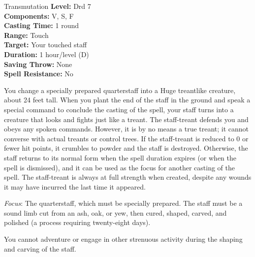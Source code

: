 {Transmutation}
{
	\textbf{Level:}
	Drd 7\\
	\textbf{Components:}
	V, S, F\\
	\textbf{Casting Time:}
	1 round\\
	\textbf{Range:}
	Touch\\
	\textbf{Target:}
	Your touched staff\\
	\textbf{Duration:}
	1 hour/level (D)\\
	\textbf{Saving Throw:}
	None\\
	\textbf{Spell Resistance:}
	No\\
}
{
	You change a specially prepared quarterstaff into a Huge treantlike creature, about 24 feet tall. When you plant the end of the staff in the ground and speak a special command to conclude the casting of the spell, your staff turns into a creature that looks and fights just like a treant. The staff-treant defends you and obeys any spoken commands. However, it is by no means a true treant; it cannot converse with actual treants or control trees. If the staff-treant is reduced to 0 or fewer hit points, it crumbles to powder and the staff is destroyed. Otherwise, the staff returns to its normal form when the spell duration expires (or when the spell is dismissed), and it can be used as the focus for another casting of the spell. The staff-treant is always at full strength when created, despite any wounds it may have incurred the last time it appeared.

	\textit{Focus}:
	The quarterstaff, which must be specially prepared. The staff must be a sound limb cut from an ash, oak, or yew, then cured, shaped, carved, and polished (a process requiring twenty-eight days).

	You cannot adventure or engage in other strenuous activity during the shaping and carving of the staff.

}
